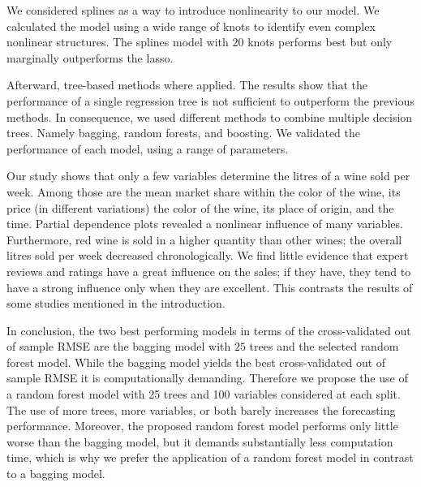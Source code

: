 \documentclass[11pt,]{article}
\begin{document}
We considered splines as a way to introduce nonlinearity to our model.
We calculated the model using a wide range of knots to identify even
complex nonlinear structures. The splines model with \(20\) knots
performs best but only marginally outperforms the \ac{lasso}.

Afterward, tree-based methods where applied. The results show that the
performance of a single regression tree is not sufficient to outperform
the previous methods. In consequence, we used different methods to
combine multiple decision trees. Namely bagging, random forests, and
boosting. We validated the performance of each model, using a range of
parameters.

Our study shows that only a few variables determine the litres of a wine
sold per week. Among those are the mean market share within the color of
the wine, its price (in different variations) the color of the wine, its
place of origin, and the time. Partial dependence plots revealed a
nonlinear influence of many variables. Furthermore, red wine is sold in
a higher quantity than other wines; the overall litres sold per week
decreased chronologically. We find little evidence that expert reviews
and ratings have a great influence on the sales; if they have, they tend
to have a strong influence only when they are excellent. This contrasts
the results of some studies mentioned in the introduction.

In conclusion, the two best performing models in terms of the
cross-validated out of sample \ac{RMSE} are the bagging model with
\(25\) trees and the selected random forest model. While the bagging
model yields the best cross-validated out of sample \ac{RMSE} it is
computationally demanding. Therefore we propose the use of a random
forest model with 25 trees and 100 variables considered at each split.
The use of more trees, more variables, or both barely increases the
forecasting performance. Moreover, the proposed random forest model
performs only little worse than the \ac{bagging} model, but it demands
substantially less computation time, which is why we prefer the
application of a random forest model in contrast to a bagging model.

\pagebreak

\printbibliography[title = References]
\cleardoublepage

\begin{refsection}
\nocite{R-base}
\nocite{R-broom}
\nocite{R-dplyr}
\nocite{R-ggplot2}
\nocite{R-haven}
\nocite{R-lmtest}
\nocite{R-PerformanceAnalytics}
\nocite{R-rstudioapi}
\nocite{R-sandwich}
\nocite{R-stargazer}
\nocite{R-svMisc}
\nocite{R-tidyr}
\nocite{R-xts}
\nocite{R-Studio}
\printbibliography[title = Software-References]
\end{refsection}
\end{document}
